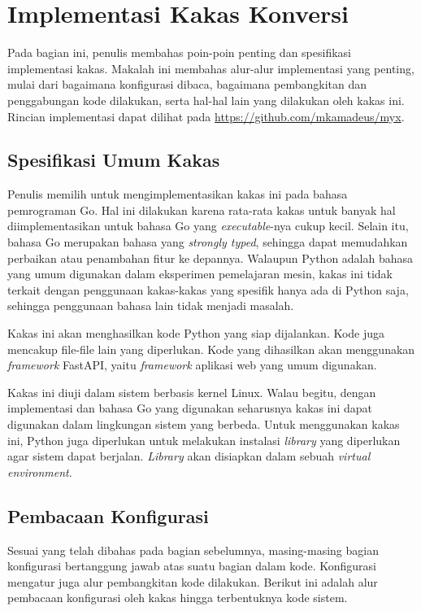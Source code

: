 \section{Implementasi Kakas Konversi}

Pada bagian ini, penulis membahas poin-poin penting dan spesifikasi implementasi kakas.
Makalah ini membahas alur-alur implementasi yang penting, mulai dari bagaimana konfigurasi dibaca, bagaimana pembangkitan dan penggabungan kode dilakukan, serta hal-hal lain yang dilakukan oleh kakas ini.
Rincian implementasi dapat dilihat pada \url{https://github.com/mkamadeus/myx}.

\subsection{Spesifikasi Umum Kakas}

Penulis memilih untuk mengimplementasikan kakas ini pada bahasa pemrograman Go.
Hal ini dilakukan karena rata-rata kakas untuk banyak hal diimplementasikan untuk bahasa Go yang \textit{executable}-nya cukup kecil.
Selain itu, bahasa Go merupakan bahasa yang \textit{strongly typed}, sehingga dapat memudahkan perbaikan atau penambahan fitur ke depannya.
Walaupun Python adalah bahasa yang umum digunakan dalam eksperimen pemelajaran mesin, kakas ini tidak terkait dengan penggunaan kakas-kakas yang spesifik hanya ada di Python saja, sehingga penggunaan bahasa lain tidak menjadi masalah.

Kakas ini akan menghasilkan kode Python yang siap dijalankan.
Kode juga mencakup file-file lain yang diperlukan.
Kode yang dihasilkan akan menggunakan \textit{framework} FastAPI, yaitu \textit{framework} aplikasi web yang umum digunakan.

Kakas ini diuji dalam sistem berbasis kernel Linux.
Walau begitu, dengan implementasi dan bahasa Go yang digunakan seharusnya kakas ini dapat digunakan dalam lingkungan sistem yang berbeda.
Untuk menggunakan kakas ini, Python juga diperlukan untuk melakukan instalasi \textit{library} yang diperlukan agar sistem dapat berjalan.
\textit{Library} akan disiapkan dalam sebuah \textit{virtual environment}.

\subsection{Pembacaan Konfigurasi}

Sesuai yang telah dibahas pada bagian sebelumnya, masing-masing bagian konfigurasi bertanggung jawab atas suatu bagian dalam kode.
Konfigurasi mengatur juga alur pembangkitan kode dilakukan.
Berikut ini adalah alur pembacaan konfigurasi oleh kakas hingga terbentuknya kode sistem.

